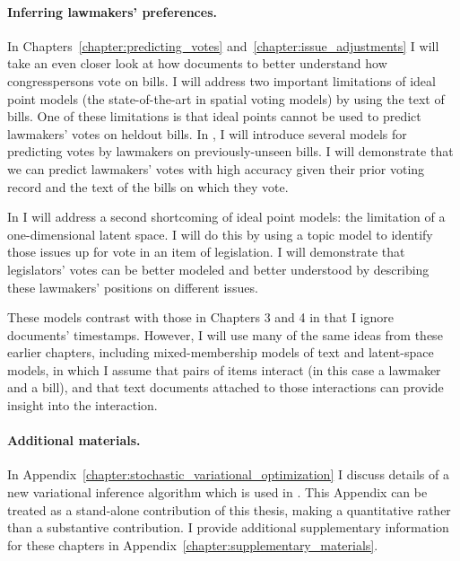 
\paragraph{Inferring lawmakers' preferences.}

In Chapters~\ref{chapter:predicting_votes}
and~\ref{chapter:issue_adjustments} I will take an even closer look at
how documents to better understand how congresspersons vote on
bills.  I will address two important limitations of ideal point models
(the state-of-the-art in spatial voting models) by using the text of
bills.  One of these limitations is that ideal points cannot be used
to predict lawmakers' votes on heldout bills.  In
, I will introduce several models for
predicting votes by lawmakers on previously-unseen bills.  I will
demonstrate that we can predict lawmakers' votes with high accuracy
given their prior voting record and the text of the bills on which
they vote.

In  I will address a second shortcoming of
ideal point models: the limitation of a one-dimensional latent space.
I will do this by using a topic model to identify those issues up for
vote in an item of legislation.  I will demonstrate that legislators'
votes can be better modeled and better understood by describing these
lawmakers' positions on different issues.

These models contrast with those in Chapters 3 and 4 in that I ignore
documents' timestamps.  However, I will use many of the same ideas
from these earlier chapters, including mixed-membership models of text
and latent-space models, in which I assume that pairs of items
interact (in this case a lawmaker and a bill), and that text documents
attached to those interactions can provide insight into the
interaction.

\paragraph{Additional materials.}
In Appendix~\ref{chapter:stochastic_variational_optimization} I
discuss details of a new variational inference algorithm which is used
in .  This Appendix can be treated as a
stand-alone contribution of this thesis, making a quantitative rather
than a substantive contribution.  I provide additional supplementary
information for these chapters in
Appendix~\ref{chapter:supplementary_materials}.
